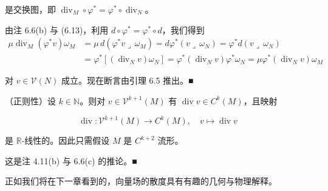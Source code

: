 \begin{remark}
\begin{items}
是交换图，即 $ \operatorname{div}_M\circ\varphi^{*} = \varphi^{*}\circ\operatorname{div}_N $。

\proofhead
由注 6.6(b) 与 (6.13)，利用 $ d\circ\varphi^{*} = \varphi^{*}\circ d $，我们得到
\begin{equation*}
\begin{aligned}
\mu\operatorname{div}_{M}(\varphi^{*}v)\omega_{M} &= \mu\,d(\varphi^{*}v\lrcorner\,\omega_{M}) = d\varphi^{*}(v\lrcorner\,\omega_{N}) = \varphi^{*}d(v\lrcorner\,\omega_{N}) \\ &= \varphi^{*}[(\operatorname{div}_{N}v)\omega_{N}] = \varphi^{*}(\operatorname{div}_{N}v)\varphi^{*}\omega_{N} = \mu\varphi^{*}(\operatorname{div}_{N}v)\omega_{M}
\end{aligned}
\end{equation*}

对 $ v \in \mathcal{V}(N) $ 成立。现在断言由引理 6.5 推出。\nobreak\hspace{0.35em}■

\item

（正则性）设 $ k \in \mathbb{N} $。则对 $ v \in \mathcal{V}^{k+1}(M) $ 有 $ \operatorname{div} v \in C^{k}(M) $，且映射

\[
\operatorname{div}: \mathcal{V}^{k+1}(M) \to C^{k}(M), \quad v \mapsto \operatorname{div} v
\]

是 $ \mathbb{R} $-线性的。因此只需假设 $ M $ 是 $ C^{k+2} $ 流形。

\proofhead
这是注 4.11(b) 与 6.6(c) 的推论。\nobreak\hspace{0.35em}■
\end{items}

正如我们将在下一章看到的，向量场的散度具有有趣的几何与物理解释。

\end{remark}

